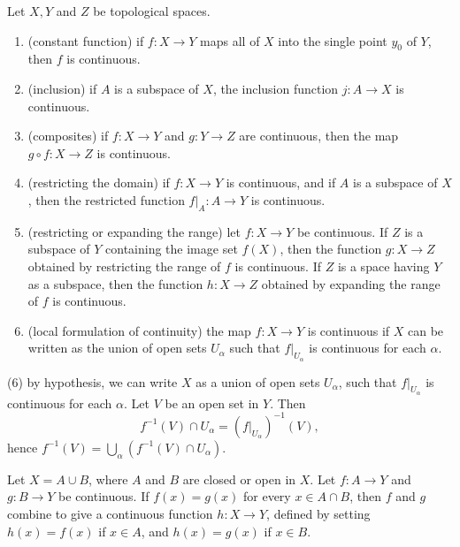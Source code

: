 \begin{theorem}
  Let \( X, Y \) and \( Z \) be topological spaces.
  \begin{enumerate}
    \item (constant function) if \( f: X \to Y \) maps all of \( X \) into the single point \( y_0 \) of \( Y \), then \( f \) is continuous.
    \item (inclusion) if \( A \) is a subspace of \( X \), the inclusion function \( j: A \to X \) is continuous.
    \item (composites) if \( f: X \to Y \) and \( g: Y \to Z \) are continuous, then the map \( g \circ f: X \to Z \) is continuous.
    \item (restricting the domain) if \( f: X \to Y \) is continuous, and if \( A \) is a subspace of \( X \), then the restricted function \( \left. f \right\vert_A: A \to Y \) is continuous.
    \item (restricting or expanding the range) let \( f: X \to Y \) be continuous.
      If \( Z \) is  a subspace of \( Y \) containing the image set \( f(X) \), then the function \( g: X \to Z \) obtained by restricting the range of \( f \) is continuous.
      If \( Z \) is a space having \( Y \) as a subspace, then the function \( h: X \to Z \) obtained by expanding the range of \( f \) is continuous.
    \item (local formulation of continuity) the map \( f: X \to Y \) is continuous if \( X \) can be written as the union of open sets \( U_\alpha \) such that \( \left. f \right\vert_{U_\alpha} \) is continuous for each \( \alpha \).
  \end{enumerate}
\end{theorem}
\begin{sketchproof}
  (6) by hypothesis, we can write \( X \) as a union of open sets \( U_\alpha \), such that \( \left. f \right\vert_{U_\alpha} \) is continuous for each \( \alpha \).
    Let \( V \) be an open set in \( Y \).
    Then
    \[
      f^{-1}(V) \cap U_\alpha = ( \left. f \right\vert_{U_\alpha} )^{-1}(V),
    \]
    hence \( f^{-1}(V) = \bigcup_\alpha(f^{-1}(V) \cap U_\alpha) \).
\end{sketchproof}

\begin{theorem}
  Let \( X = A \cup B \), where \( A \) and \( B \) are closed or open in \( X \).
  Let \( f: A \to Y \) and \( g: B \to Y \) be continuous.
  If \( f(x) = g(x) \) for every \( x \in A \cap B \), then \( f \) and \( g \) combine to give a continuous function \( h: X \to Y \), defined by setting \( h(x) = f(x) \) if \( x \in A \), and \( h(x) = g(x) \) if \( x \in B \).
\end{theorem}

